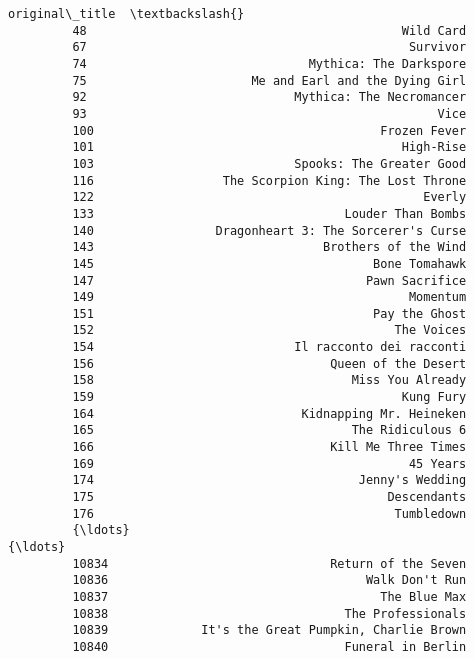 \documentclass[11pt]{article}
\begin{document}
\begin{Verbatim}[commandchars=\\\{\}]
                                                  original\_title  \textbackslash{}
         48                                            Wild Card   
         67                                             Survivor   
         74                               Mythica: The Darkspore   
         75                       Me and Earl and the Dying Girl   
         92                             Mythica: The Necromancer   
         93                                                 Vice   
         100                                        Frozen Fever   
         101                                           High-Rise   
         103                            Spooks: The Greater Good   
         116                  The Scorpion King: The Lost Throne   
         122                                              Everly   
         133                                   Louder Than Bombs   
         140                 Dragonheart 3: The Sorcerer's Curse   
         143                                Brothers of the Wind   
         145                                       Bone Tomahawk   
         147                                      Pawn Sacrifice   
         149                                            Momentum   
         151                                       Pay the Ghost   
         152                                          The Voices   
         154                            Il racconto dei racconti   
         156                                 Queen of the Desert   
         158                                    Miss You Already   
         159                                           Kung Fury   
         164                             Kidnapping Mr. Heineken   
         165                                    The Ridiculous 6   
         166                                 Kill Me Three Times   
         169                                            45 Years   
         174                                     Jenny's Wedding   
         175                                         Descendants   
         176                                          Tumbledown   
         {\ldots}                                                 {\ldots}   
         10834                               Return of the Seven   
         10836                                    Walk Don't Run   
         10837                                      The Blue Max   
         10838                                 The Professionals   
         10839             It's the Great Pumpkin, Charlie Brown   
         10840                                 Funeral in Berlin   

\end{Verbatim}
\end{document}
